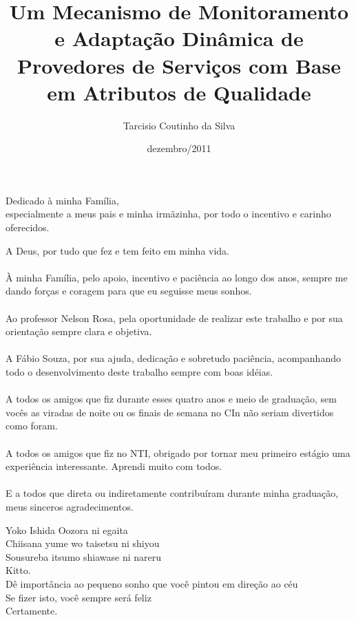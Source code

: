 \documentclass[pt,bsc,oneside,onehalfspacing]{risethesis}
\title{Um Mecanismo de Monitoramento e Adaptação Dinâmica de Provedores de Serviços com Base em Atributos de Qualidade}
\date{dezembro/2011}
\author{Tarcisio Coutinho da Silva}
\begin{document}
\frontmatter
\frontpage
\presentationpage

\begin{dedicatory}
Dedicado à minha Família, \\
especialmente a meus pais e minha irmãzinha, por todo o incentivo e carinho oferecidos.
\end{dedicatory}

\acknowledgements

A Deus, por tudo que fez e tem feito em minha vida.
\\\\
À minha Família, pelo apoio, incentivo e paciência ao longo dos anos, sempre me dando forças e coragem para que eu seguisse meus sonhos.
\\\\
Ao professor Nelson Rosa, pela oportunidade de realizar este trabalho e por sua orientação sempre clara e objetiva.
\\\\
A Fábio Souza, por sua ajuda, dedicação e sobretudo paciência, acompanhando todo o desenvolvimento deste trabalho sempre com boas idéias.
\\\\
A todos os amigos que fiz durante esses quatro anos e meio de graduação, sem vocês as viradas de noite ou os finais de semana no CIn não seriam divertidos como foram.
\\\\
A todos os amigos que fiz no NTI, obrigado por tornar meu primeiro estágio uma experiência interessante. Aprendi muito com todos.
\\\\
E a todos que direta ou indiretamente contribuíram durante minha graduação, meus sinceros agradecimentos.

\begin{epigraph}{Yoko Ishida}
Oozora ni egaita\\
Chiisana yume wo taisetsu ni shiyou\\
Sousureba itsumo shiawase ni nareru\\
Kitto.\\
\vspace{0.5cm}
Dê importância ao pequeno sonho que você pintou em direção ao céu\\
Se fizer isto, você sempre será feliz\\
Certamente.
\vspace{0.2cm}
\end{epigraph}
\end{document}
